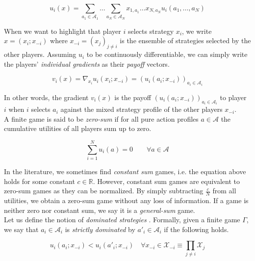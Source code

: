 \begin{equation*}
    u_i(x) = \sum_{a_1\in\mathcal{A}_1}\dots\sum_{a_N\in\mathcal{A}_N} x_{1,a_1} \dots x_{N,a_N}u_i(a_1,\dots,a_N)
\end{equation*}

When we want to highlight that player $i$ selects strategy $x_i$, we write $x = (x_i;x_{-i})$ where $x_{-i} = {(x_j)}_{j\neq i}$ is the ensemble of strategies selected by the other players. Assuming $u_i$ to be continuously differentiable, we can simply write the players' \textit{individual gradients} as their \textit{payoff} vectors. 

\begin{equation*}
    v_i(x) = \nabla_{x_i}u_i(x_i;x_{-i}) = (u_i(a_i;x_{-i}))_{a_i\in\mathcal{A}_i}
\end{equation*}

In other words, the gradient $v_i(x)$ is the payoff $(u_i(a_i;x_{-i}))_{a_i\in\mathcal{A}_i}$ to player $i$ when $i$ selects $a_i$ against the mixed strategy profile of the other players $x_{-i}$. \\

A finite game is said to be \textit{zero-sum} if for all pure action profiles $a \in \mathcal{A}$ the cumulative utilities of all players sum up to zero.  

\begin{equation}\label{equ:zeroSum}
    \sum_{i = 1}^{N} u_i(a)= 0 \qquad \forall a \in \mathcal{A}
\end{equation}

In the literature, we sometimes find \textit{constant sum} games, i.e. the equation above holds for some constant $c \in \mathbb{R}$. However, constant sum games are equivalent to zero-sum games as they can be normalized. By simply subtracting $\frac{c}{N}$ from all utilities, we obtain a zero-sum game without any loss of information. If a game is neither zero nor constant sum, we say it is a \textit{general-sum} game.\\

Let us define the notion of \textit{dominated strategies} \cite{HDRmertikopoulos}. Formally, given a finite game $\Gamma$, we say that $a_i \in \mathcal{A}_i$ is \textit{strictly dominated} by $a'_i \in \mathcal{A}_i$ if the following holds.

\begin{equation}\label{equ:dominatedStrategy}
    u_i(a_i;x_{-i}) < u_i(a'_i;x_{-i}) \quad \forall x_{-i} \in \mathcal{X}_{-i} \equiv \prod_{j \neq i} \mathcal{X}_j
\end{equation}


